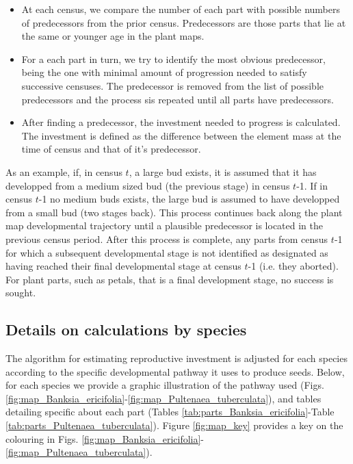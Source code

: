\documentclass[10pt,twoside]{article}\usepackage[]{graphicx}\usepackage[]{color}
\begin{document}
\begin{itemize}
\item At each census, we compare the number of each part with possible numbers of predecessors from the prior census. Predecessors are those parts that lie at the same or younger age in the plant maps.
\item For a each part in turn, we try to identify the most obvious predecessor, being the one with minimal amount of progression needed to satisfy successive censuses. The predecessor is removed from the list of possible predecessors and the process sis repeated until all parts have predecessors.
\item After finding a predecessor, the investment needed to progress  is calculated. The investment is defined as the difference between the element mass at the time of census and that of it's predecessor.
\end{itemize}

As an example, if, in census $t$, a large bud exists, it is assumed that it has developped from a medium sized bud (the previous stage) in census $t$-1. If in census $t$-1 no medium buds exists, the large bud is assumed to have developped from a small bud (two stages back). This process continues back along the plant map developmental trajectory until a plausible predecessor is located in the previous census period. After this process is complete, any parts from census $t$-1 for which a subsequent developmental stage is not identified as designated as having reached their final developmental stage at census $t$-1 (i.e. they aborted). For plant parts, such as petals, that is a final development stage, no success is sought.


\subsection{Details on calculations by species}

The algorithm for estimating reproductive investment is adjusted for each species according to the specific developmental pathway it uses to produce seeds. Below, for each species we provide a graphic illustration of the pathway used (Figs. \ref{fig:map_Banksia_ericifolia}-\ref{fig:map_Pultenaea_tuberculata}), and tables detailing specific about each part (Tables \ref{tab:parts_Banksia_ericifolia}-Table \ref{tab:parts_Pultenaea_tuberculata}).  Figure \ref{fig:map_key} provides a key on the colouring in Figs. \ref{fig:map_Banksia_ericifolia}-\ref{fig:map_Pultenaea_tuberculata}).
\end{document}
